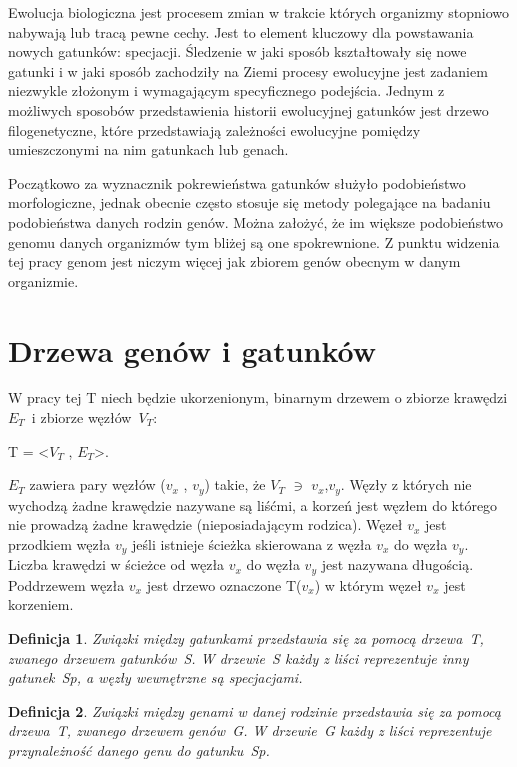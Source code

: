 \documentclass[licencjacka]{pracamgr}
\newtheorem{defi}{Definicja}[section]
\begin{document}
Ewolucja biologiczna jest procesem zmian w trakcie których organizmy stopniowo nabywają lub tracą pewne cechy. Jest to element kluczowy dla powstawania nowych gatunków: specjacji. Śledzenie w jaki sposób kształtowały się nowe gatunki i w jaki sposób zachodziły na Ziemi procesy ewolucyjne jest zadaniem niezwykle złożonym i wymagającym specyficznego podejścia. Jednym z możliwych sposobów przedstawienia historii ewolucyjnej gatunków jest drzewo filogenetyczne, które przedstawiają zależności ewolucyjne pomiędzy umieszczonymi na nim gatunkach lub genach. 

Początkowo za wyznacznik pokrewieństwa gatunków służyło podobieństwo morfologiczne, jednak obecnie często stosuje się metody polegające na badaniu podobieństwa danych rodzin genów. Można założyć, że im większe podobieństwo genomu danych organizmów tym bliżej są one spokrewnione. Z punktu widzenia tej pracy genom jest niczym więcej jak zbiorem genów obecnym w danym organizmie. 


\section{Drzewa genów i gatunków}

W pracy tej T niech będzie ukorzenionym, binarnym drzewem o zbiorze krawędzi $E_T$~i zbiorze węzłów~$V_T$: 
\begin{center}
T = <$V_T$ , $E_T$>.
\end{center}
$E_T$ zawiera pary węzłów ($v_x$ , $v_y$) takie, że $V_T$ $\ni$ $v_x$,$v_y$. Węzły z których nie wychodzą żadne krawędzie nazywane są liśćmi, a korzeń jest węzłem do którego nie prowadzą żadne krawędzie (nieposiadającym rodzica). Węzeł $v_x$ jest przodkiem węzła $v_y$ jeśli istnieje ścieżka skierowana z węzła $v_x$ do węzła $v_y$. Liczba krawędzi w ścieżce od węzła $v_x$ do węzła $v_y$ jest nazywana długością. Poddrzewem węzła $v_x$ jest drzewo oznaczone T($v_x$) w którym węzeł $v_x$ jest korzeniem.


\begin{defi}\label{Drzewa gatunków}
  Związki między gatunkami przedstawia się za pomocą drzewa~T, zwanego drzewem gatunków~S. W drzewie~S każdy z liści reprezentuje inny gatunek~Sp, a węzły wewnętrzne są specjacjami.
\end{defi}

\begin{defi}\label{Drzewa genów}
  Związki między genami w danej rodzinie przedstawia się za pomocą drzewa~T, zwanego drzewem genów~G. W drzewie~G każdy z liści reprezentuje przynależność danego genu do gatunku~Sp.
\end{defi}
\end{document}
